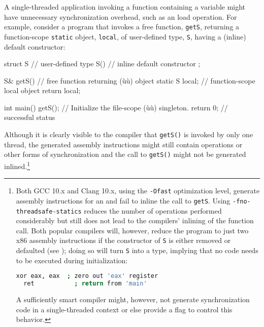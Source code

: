 A single-threaded application invoking a function containing a
  variable might
have unnecessary synchronization overhead, such as an 
load operation. For example, consider a program that invokes a free
function, \lstinline!getS!, returning a function-scope \lstinline!static!
object, \lstinline!local!, of user-defined type, \lstinline!S!, having a
 (inline) default constructor:

\begin{emcppslisting}
struct S  // user-defined type
{
    S() { }  // inline default constructor
};

S& getS()  // free function returning (ù{}ù) object
{
    static S local;  // function-scope local object
    return local;
}

int main()
{
    getS();    // Initialize the file-scope (ù{}ù) singleton.
    return 0;  // successful status
}
\end{emcppslisting}

\noindent Although it is clearly visible to the compiler that \lstinline!getS()! is
invoked by only one thread, the generated assembly instructions might
still contain  operations or other forms of
synchronization and the call to \lstinline!getS()! might not be generated
inlined.{\cprotect\footnote{Both GCC 10.x and Clang 10.x, using the
\lstinline!-Ofast! optimization level, generate assembly instructions for
an  and fail to inline the call
to \lstinline!getS!. Using \lstinline!-fno-threadsafe-statics! reduces the
number of operations performed considerably but still does not lead to
the compilers' inlining of the function call. Both popular compilers
will, however, reduce the program to just two x86 assembly
instructions if the  constructor of \lstinline!S!
  is either removed or defaulted (see );
  doing so will turn \lstinline!S! into a 
  type, implying that no code needs to be executed during
  initialization:

  \begin{lstlisting}[language=bash,style=footcodeplain]
  xor eax, eax  ; zero out 'eax' register
  ret           ; return from 'main'
  \end{lstlisting}

\noindent A sufficiently smart compiler might, however, not generate
  synchronization code in a single-threaded context or else provide a
  flag to control this behavior.

  }}

